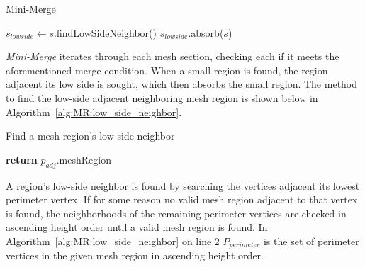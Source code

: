 \begin{algorithm}[htb]
\caption{Mini-Merge}\label{alg:WS:mini_merge}
\begin{algorithmic}[1]
			\State $s_{lowside} \leftarrow s$.findLowSideNeighbor()
			\State $s_{lowside}$.absorb($s$)
		\EndIf
	\EndFor
\end{algorithmic}
\end{algorithm}

\textit{Mini-Merge} iterates through each mesh section, checking each if it meets the aforementioned merge condition.
When a small region is found, the region adjacent its low side is sought, which then absorbs the small region.
The method to find the low-side adjacent neighboring mesh region is shown below in Algorithm~\ref{alg:MR:low_side_neighbor}.

\begin{algorithm}[htb]
\caption{Find a mesh region's low side neighbor}\label{alg:MR:low_side_neighbor}
\begin{algorithmic}[1]
				\State \textbf{return} $p_{adj}$.meshRegion
			\EndIf
		\EndFor
	\EndFor
\EndFunction
\end{algorithmic}
\end{algorithm}

A region's low-side neighbor is found by searching the vertices adjacent its lowest perimeter vertex.
If for some reason no valid mesh region adjacent to that vertex is found, the neighborhoods of the remaining perimeter vertices are checked in ascending height order until a valid mesh region is found.
In Algorithm~\ref{alg:MR:low_side_neighbor} on line 2 $P_{perimeter}$ is the set of perimeter vertices in the given mesh region in ascending height order.

